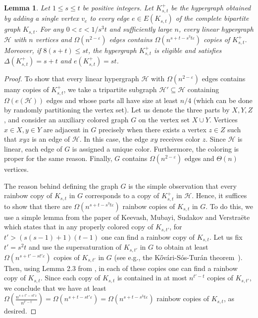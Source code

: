 \documentclass[11pt]{article}
\numberwithin{equation}{section}
\def\eps{\varepsilon}
\def\cH{\mathcal{H}}
\theoremstyle{plain}
\newtheorem{lemma}[theorem]{Lemma}
\theoremstyle{remark}
\begin{document}
\begin{lemma}\label{lemma:start}
Let $1\leq s\leq t$ be positive integers. Let $K_{s, t}^+$ be the hypergraph obtained by adding a single vertex $v_e$ to every edge $e\in E(K_{s, t})$ of the complete bipartite graph $K_{s, t}$. For any $0<\eps<1/s^3t$ and sufficiently large $n$, every linear hypergraph $\cH$ with $n$ vertices and $\Omega(n^{2-\eps})$ edges contains $\Omega(n^{s+t-s^3t\eps})$ copies of $K_{s, t}^+$. Moreover, if $8(s+t)\leq st$, the hypergraph $K_{s, t}^+$ is eligible and satisfies $\Delta(K_{s, t}^+)=s+t$ and $e(K_{s, t}^+)=st$.
\end{lemma}
\begin{proof}
To show that every linear hypergraph $\cH$ with $\Omega(n^{2-\eps})$ edges contains many copies of $K_{s, t}^+$, we take a tripartite subgraph $\cH'\subseteq \cH$ containing $\Omega(e(\cH))$ edges and whose parts all have size at least $n/4$ (which can be done by randomly partitioning the vertex set). Let us denote the three parts by $X, Y, Z$, and consider an auxiliary colored graph $G$ on the vertex set $X\cup Y$. Vertices $x\in X, y\in Y$ are adjacent in $G$ precisely when there exists a vertex $z\in Z$ such that $xyz$ is an edge of $\cH$. In this case, the edge $xy$ receives color $z$. Since $\cH$ is linear, each edge of $G$ is assigned a unique color. Furthermore, the coloring is proper for the same reason. Finally, $G$ contains $\Omega(n^{2-\eps})$ edges and $\Theta(n)$ vertices.

The reason behind defining the graph $G$ is the simple observation that every rainbow copy of $K_{s, t}$ in $G$ corresponds to a copy of $K_{s, t}^+$ in $\cH$. Hence, it suffices to show that there are $\Omega(n^{s+t-s^3t\eps})$ rainbow copies of $K_{s, t}$ in $G$. To do this, we use a simple lemma from the paper of Keevash, Mubayi, Sudakov and Verstra\"ete \cite{KMSV07} which states that in any properly colored copy of $K_{s, t'}$, for $t'>(s(s-1)+1)(t-1)$ one can find a rainbow copy of $K_{s, t}$. Let us fix $t'=s^2t$ and use the supersaturation of $K_{s, t'}$ in $G$ to obtain at least $\Omega(n^{s+t'-st'\eps})$ copies of $K_{s, t'}$ in $G$ (see e.g., the K\H{o}v\'{a}ri-S\'{o}s-Tur\'{a}n theorem~\cite{kHovari1954problem}). Then, using Lemma 2.3 from \cite{KMSV07}, in each of these copies one can find a rainbow copy of $K_{s, t}$. Since each copy of $K_{s, t}$ is contained in at most $n^{t'-t}$ copies of $K_{s, t'}$, we conclude that we have at least $\Omega(\frac{n^{s+t'-st'\eps}}{n^{t'-t}})=\Omega(n^{s+t-st'\eps})=\Omega(n^{s+t-s^3t\eps})$ rainbow copies of $K_{s, t}$, as desired.


\end{proof}
\end{document}
